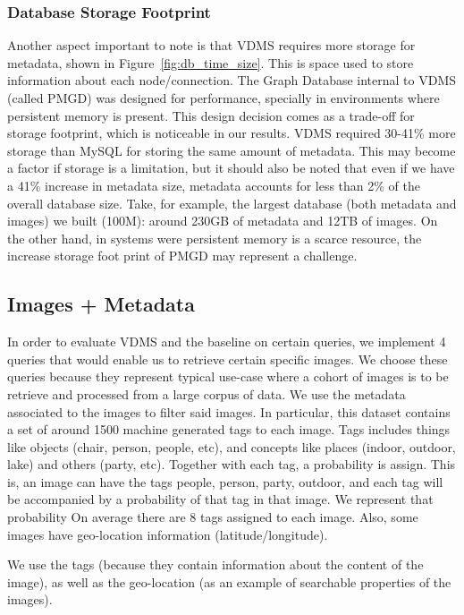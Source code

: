 \subsubsection{Database Storage Footprint}

Another aspect important to note is that
VDMS requires more storage for metadata, shown in Figure~\ref{fig:db_time_size}.
This is space used to store information about each node/connection.
The Graph Database internal to VDMS (called PMGD) was designed for performance,
specially in environments where persistent memory is present.
This design decision comes as a trade-off for storage footprint, which is
noticeable in our results.
VDMS required 30-41\% more storage than MySQL for storing the same amount
of metadata.
This may become a factor if storage is a limitation, but it should also be noted
that even if we have a 41\% increase in metadata size,
metadata accounts for less than 2\% of the overall database size.
Take, for example, the largest database (both metadata and images) we built
(100M): around 230GB of metadata and 12TB of images.
On the other hand, in systems were persistent memory is a scarce resource,
the increase storage foot print of PMGD may represent a challenge.


\subsection{Images + Metadata}
\label{images}

In order to evaluate VDMS and the baseline on certain queries, we
implement 4 queries that would enable us to retrieve certain specific images.
We choose these queries because they represent typical use-case where a
cohort of images is to be retrieve and processed from a large corpus of data.
We use the metadata associated to the images to filter said images.
In particular, this dataset contains a set of around 1500 machine generated
tags to each image.
Tags includes things like objects (chair, person, people, etc), and
concepts like places (indoor, outdoor, lake) and others (party, etc).
Together with each tag, a probability is assign.
This is, an image can have the tags people, person, party, outdoor, and each
tag will be accompanied by a probability of that tag in that image.
We represent that probability
On average there are 8 tags assigned to each image.
Also, some images have geo-location information (latitude/longitude).

We use the tags (because they contain information about the content of
the image), as well as the geo-location (as an example of searchable properties
of the images).

